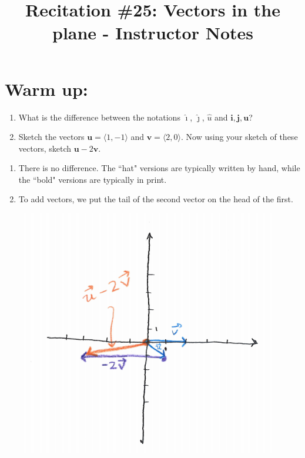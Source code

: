 \documentclass[handout,instructornotes]{ximera}
\title{Recitation \#25: Vectors in the plane - Instructor Notes}
\begin{document}
\begin{abstract}		\end{abstract}
\maketitle




\section{Warm up:}
\begin{enumerate}
\item What is the difference between the notations $\hat{\imath}$, $\hat{\jmath}$, $\hat{u}$ and $\mathbf{i}, \mathbf{j}, \mathbf{u}$?
\item Sketch the vectors $\mathbf{u}=\langle 1, -1 \rangle$ and $\mathbf{v}=\langle 2, 0 \rangle$. Now using your sketch of these vectors, sketch $\mathbf{u}-2\mathbf{v}$.
\end{enumerate}
	\begin{freeResponse}
	\begin{enumerate}
	\item There is no difference. The ``hat" versions are typically written by hand, while the ``bold" versions are typically in print. 
	\item To add vectors, we put the tail of the second vector on the head of the first. 


\includegraphics[scale=0.5]{Figure12-1-1}



	\end{enumerate}
	\end{freeResponse}
	
\end{document}
